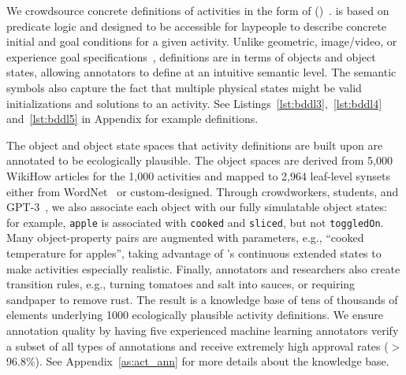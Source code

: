 We crowdsource concrete definitions of activities in the form of \bddlfull (\bddl)~\cite{srivastava2021behavior}. \bddl is based on predicate logic and designed to be accessible for laypeople to describe concrete initial and goal conditions for a given activity. Unlike geometric, image/video, or experience goal specifications~\cite{batra2020rearrangement, weihs2021visual}, \bddl definitions are in terms of objects and object states, allowing annotators to define at an intuitive semantic level. The semantic symbols also capture the fact that multiple physical states might be valid initializations and solutions to an activity. See Listings~\ref{lst:bddl3},~\ref{lst:bddl4} and~\ref{lst:bddl5} in Appendix for example definitions.


The object and object state spaces that activity definitions are built upon are annotated to be ecologically plausible. The object spaces are derived from 5,000 WikiHow articles for the 1,000 activities and mapped to 2,964 leaf-level synsets either from WordNet~\cite{wordnet} or custom-designed. Through crowdworkers, students, and GPT-3~\cite{gpt3}, we also associate each object with our fully simulatable object states: for example, \texttt{apple} is associated with \texttt{cooked} and \texttt{sliced}, but not \texttt{toggledOn}.
Many object-property pairs are augmented with parameters, e.g., ``cooked temperature for apples'', taking advantage of \simulator's continuous extended states to make activities especially realistic. Finally, annotators and researchers also create transition rules, e.g., turning tomatoes and salt into sauces, or requiring sandpaper to remove rust. The result is a knowledge base of tens of thousands of elements underlying 1000 ecologically plausible activity definitions. We ensure annotation quality by having five experienced machine learning annotators verify a subset of all types of annotations and receive extremely high approval rates ($>$96.8\%). See Appendix~\ref{as:act_ann} for more details about the knowledge base.

